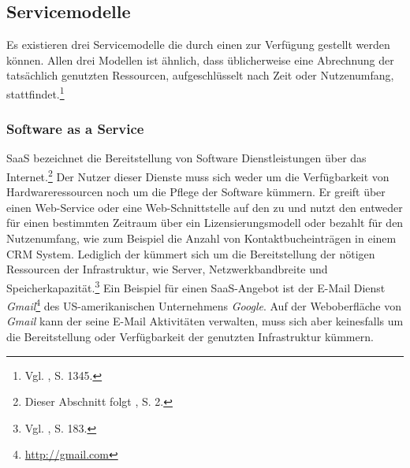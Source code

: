 \subsection{Servicemodelle}
Es existieren drei Servicemodelle die durch einen \CSP zur Verfügung gestellt werden können. Allen drei Modellen ist ähnlich, dass üblicherweise eine Abrechnung der tatsächlich genutzten Ressourcen, aufgeschlüsselt nach Zeit oder Nutzenumfang, stattfindet.\footnote{Vgl. \cite{He.2012}, S. 1345.}

\subsubsection{Software as a Service}
\label{sec:SaaS}
\acf{SaaS} bezeichnet die Bereitstellung von Software Dienstleistungen über das Internet.\footnote{Dieser Abschnitt folgt \cite{Mell.2011}, S. 2.} 
Der Nutzer dieser Dienste muss sich weder um die Verfügbarkeit von Hardwareressourcen noch um die Pflege der Software kümmern. Er greift über einen Web-Service oder eine Web-Schnittstelle auf den \CS zu und nutzt den \CS entweder für einen bestimmten Zeitraum über ein Lizensierungsmodell oder bezahlt für den Nutzenumfang, wie zum Beispiel die Anzahl von Kontaktbucheinträgen in einem \acf{CRM} System.
Lediglich der \CSP kümmert sich um die Bereitstellung der nötigen Ressourcen der \CC Infrastruktur, wie Server, Netzwerkbandbreite und Speicherkapazität.\footnote{Vgl. \cite{Marston.2011}, S. 183.} Ein Beispiel für einen \acs{SaaS}-Angebot ist der E-Mail Dienst \emph{Gmail}\footnote{\url{http://gmail.com}}
des US-amerikanischen Unternehmens \emph{Google}. 
\newline
Auf der Weboberfläche von \emph{Gmail} kann der \CSU seine E-Mail Aktivitäten verwalten, muss sich aber keinesfalls um die Bereitstellung oder Verfügbarkeit der genutzten \CC Infrastruktur kümmern.

